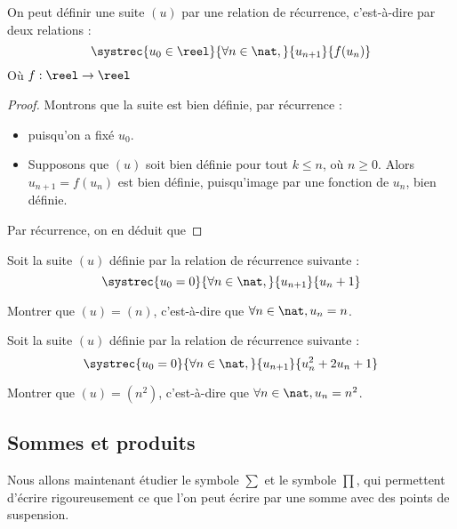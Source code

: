 \begin{defi}
    On peut définir une suite $(u)$ par une relation de récurrence, c'est-à-dire par deux relations :
    $$\systrec{u_0 \in\reel}{\forall n \in\nat,}{u_{n+1}}{f(u_n)}$$
    Où $f : \reel\to\reel$
\end{defi}
\begin{proof}
    Montrons que la suite est bien définie, par récurrence :
    \begin{itemize}[label=$\bullet$]
        \item {} puisqu'on a fixé $u_0$.
        \item Supposons que $(u)$ soit bien définie pour tout $k\leq n$, où $n\geq0$. Alors $u_{n+1}=f(u_n)$ est bien définie, puisqu'image par une fonction de $u_n$, bien définie. 
    \end{itemize}
    Par récurrence, on en déduit que 
\end{proof}

\begin{exo}
    Soit la suite $(u)$ définie par la relation de récurrence suivante :
    $$\systrec{u_0=0}{\forall n \in\nat,}{u_{n+1}}{u_n + 1}$$
    
    Montrer que $(u)=(n)$, c'est-à-dire que $\forall n \in\nat, u_n = n$.
\end{exo}

\begin{exo}
    Soit la suite $(u)$ définie par la relation de récurrence suivante :
    $$\systrec{u_0=0}{\forall n \in\nat,}{u_{n+1}}{u_n^2+2u_n + 1}$$
    
    Montrer que $(u)=(n^2)$, c'est-à-dire que $\forall n \in\nat, u_n = n^2$.
\end{exo}

\subsection{Sommes et produits}

Nous allons maintenant étudier le symbole $\sum$ et le symbole $\prod$, qui permettent d'écrire rigoureusement ce que l'on peut écrire par une somme avec des points de suspension.

